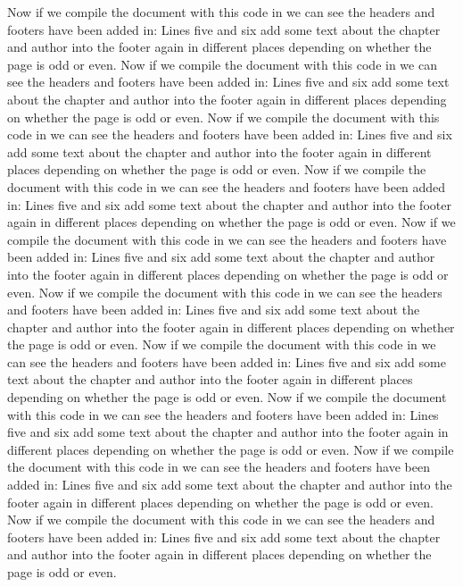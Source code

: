  \par Now if we compile the document with this code in we can see the headers and footers have been added in: Lines five and six add some text about the chapter and author into the footer again in different places depending on whether the page is odd or even. Now if we compile the document with this code in we can see the headers and footers have been added in: Lines five and six add some text about the chapter and author into the footer again in different places depending on whether the page is odd or even. Now if we compile the document with this code in we can see the headers and footers have been added in: Lines five and six add some text about the chapter and author into the footer again in different places depending on whether the page is odd or even. Now if we compile the document with this code in we can see the headers and footers have been added in: Lines five and six add some text about the chapter and author into the footer again in different places depending on whether the page is odd or even. Now if we compile the document with this code in we can see the headers and footers have been added in: Lines five and six add some text about the chapter and author into the footer again in different places depending on whether the page is odd or even. Now if we compile the document with this code in we can see the headers and footers have been added in: Lines five and six add some text about the chapter and author into the footer again in different places depending on whether the page is odd or even. Now if we compile the document with this code in we can see the headers and footers have been added in: Lines five and six add some text about the chapter and author into the footer again in different places depending on whether the page is odd or even. Now if we compile the document with this code in we can see the headers and footers have been added in: Lines five and six add some text about the chapter and author into the footer again in different places depending on whether the page is odd or even. Now if we compile the document with this code in we can see the headers and footers have been added in: Lines five and six add some text about the chapter and author into the footer again in different places depending on whether the page is odd or even. Now if we compile the document with this code in we can see the headers and footers have been added in: Lines five and six add some text about the chapter and author into the footer again in different places depending on whether the page is odd or even.
 
